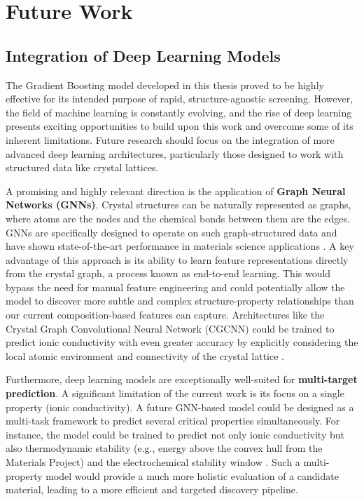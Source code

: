 \chapter{Future Work}

\section{Integration of Deep Learning Models}

The Gradient Boosting model developed in this thesis proved to be highly effective for its intended purpose of rapid, structure-agnostic screening. However, the field of machine learning is constantly evolving, and the rise of deep learning presents exciting opportunities to build upon this work and overcome some of its inherent limitations. Future research should focus on the integration of more advanced deep learning architectures, particularly those designed to work with structured data like crystal lattices.

A promising and highly relevant direction is the application of \textbf{Graph Neural Networks (GNNs)}. Crystal structures can be naturally represented as graphs, where atoms are the nodes and the chemical bonds between them are the edges. GNNs are specifically designed to operate on such graph-structured data and have shown state-of-the-art performance in materials science applications \cite{Xie2018}. A key advantage of this approach is its ability to learn feature representations directly from the crystal graph, a process known as end-to-end learning. This would bypass the need for manual feature engineering and could potentially allow the model to discover more subtle and complex structure-property relationships than our current composition-based features can capture. Architectures like the Crystal Graph Convolutional Neural Network (CGCNN) could be trained to predict ionic conductivity with even greater accuracy by explicitly considering the local atomic environment and connectivity of the crystal lattice \cite{Xie2018}.

Furthermore, deep learning models are exceptionally well-suited for \textbf{multi-target prediction}. A significant limitation of the current work is its focus on a single property (ionic conductivity). A future GNN-based model could be designed as a multi-task framework to predict several critical properties simultaneously. For instance, the model could be trained to predict not only ionic conductivity but also thermodynamic stability (e.g., energy above the convex hull from the Materials Project) and the electrochemical stability window \cite{Jain2013}. Such a multi-property model would provide a much more holistic evaluation of a candidate material, leading to a more efficient and targeted discovery pipeline.

